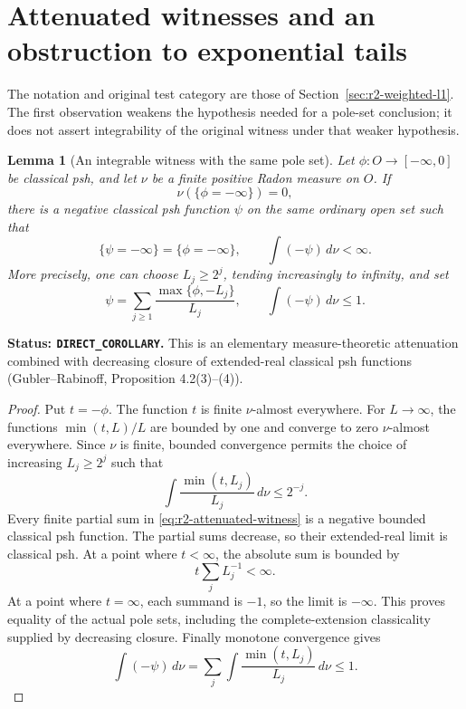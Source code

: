 \documentclass[11pt,a4paper]{article}
\numberwithin{equation}{section}
\newtheorem{lemma}[theorem]{Lemma}
\theoremstyle{definition}
\theoremstyle{remark}
\begin{document}


\section{Attenuated witnesses and an obstruction to exponential tails}
\label{sec:r2-witness-criteria}

The notation and original test category are those of
Section~\ref{sec:r2-weighted-l1}. The first observation weakens the
hypothesis needed for a pole-set conclusion; it does not assert
integrability of the original witness under that weaker hypothesis.

\begin{lemma}[An integrable witness with the same pole set]
\label{lem:r2-attenuation}
Let $\phi:O\to[-\infty,0]$ be classical psh, and let $\nu$ be a
finite positive Radon measure on $O$. If
\[
 \nu(\{\phi=-\infty\})=0,
\]
there is a negative classical psh function $\psi$ on the same
ordinary open set such that
\[
 \{\psi=-\infty\}=\{\phi=-\infty\},\qquad
                         \int(-\psi)\,d\nu<\infty.
\]
More precisely, one can choose $L_j\geq2^j$, tending increasingly
to infinity, and set
\begin{equation}
\label{eq:r2-attenuated-witness}
 \psi=\sum_{j\geq1}\frac{\max\{\phi,-L_j\}}{L_j},
 \qquad \int(-\psi)\,d\nu\leq1.
\end{equation}
\end{lemma}

\noindent\textbf{Status: \texttt{DIRECT\_COROLLARY}.}
This is an elementary measure-theoretic attenuation combined with
decreasing closure of extended-real classical psh functions
(Gubler--Rabinoff, Proposition 4.2(3)--(4)).

\begin{proof}
Put $t=-\phi$. The function $t$ is finite $\nu$-almost everywhere.
For $L\to\infty$, the functions $\min(t,L)/L$ are bounded by one
and converge to zero $\nu$-almost everywhere. Since $\nu$ is finite,
bounded convergence permits the choice of increasing $L_j\geq2^j$
such that
\[
 \int\frac{\min(t,L_j)}{L_j}\,d\nu\leq2^{-j}.
\]
Every finite partial sum in \eqref{eq:r2-attenuated-witness} is a
negative bounded classical psh function. The partial sums decrease,
so their extended-real limit is classical psh. At a point where
$t<\infty$, the absolute sum is bounded by
\[
 t\sum_j L_j^{-1}<\infty.
\]
At a point where $t=\infty$, each summand is $-1$, so the limit
is $-\infty$. This proves equality of the actual pole sets, including
the complete-extension classicality supplied by decreasing closure.
Finally monotone convergence gives
\[
 \int(-\psi)\,d\nu
   =\sum_j\int\frac{\min(t,L_j)}{L_j}\,d\nu\leq1.
\]
\end{proof}
\end{document}
